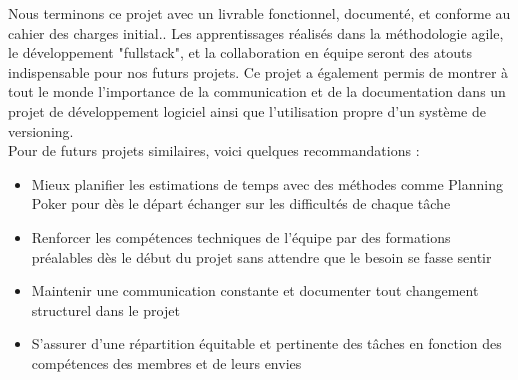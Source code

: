 \documentclass[a4paper]{article}
\begin{document}
Nous terminons ce projet avec un livrable fonctionnel, documenté, et conforme au cahier des charges initial.. Les apprentissages réalisés dans la méthodologie agile, le développement "fullstack", et la collaboration en équipe seront des atouts indispensable pour nos futurs projets. Ce projet a également permis de montrer à tout le monde l'importance de la communication et de la documentation dans un projet de développement logiciel ainsi que l'utilisation propre d'un système de versioning. \\

Pour de futurs projets similaires, voici quelques recommandations :
\begin{itemize}
    \item Mieux planifier les estimations de temps avec des méthodes comme Planning Poker pour dès le départ échanger sur les difficultés de chaque tâche
    \item Renforcer les compétences techniques de l'équipe par des formations préalables dès le début du projet sans attendre que le besoin se fasse sentir
    \item Maintenir une communication constante et documenter tout changement structurel dans le projet
    \item S'assurer d'une répartition équitable et pertinente des tâches en fonction des compétences des membres et de leurs envies
\end{itemize}
\end{document}
